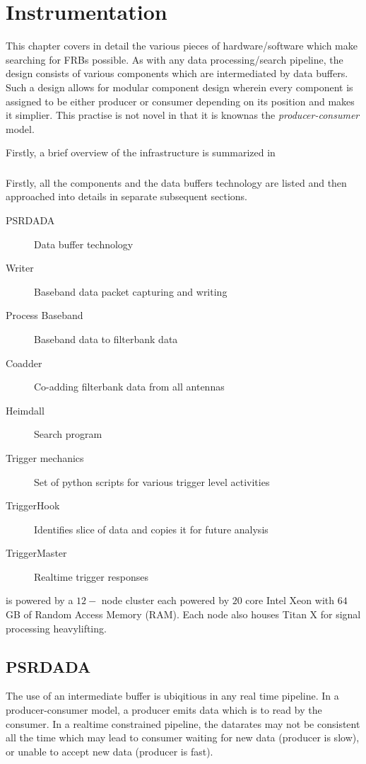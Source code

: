 \chapter{Instrumentation}
\label{ch:inst}

\par This chapter covers in detail the various pieces of hardware/software which make searching for FRBs possible. As with any data processing/search pipeline, the design consists of various components which are intermediated by data buffers. Such a design allows for modular component design wherein every component is assigned to be either producer or consumer depending on its position and makes it simplier. This practise is not novel in that it is knownas the \emph{producer-consumer} model.

\par Firstly, a brief overview of the infrastructure is summarized in 

\subsection {}

\par Firstly, all the components and the data buffers technology are listed and then approached into details in separate subsequent sections.
\begin{description}
\item[PSRDADA] Data buffer technology
\item[Writer]  Baseband data packet capturing and writing
\item[Process Baseband] Baseband data to filterbank data
\item[Coadder] Co-adding filterbank data from all antennas
\item[Heimdall] Search program 
\item[Trigger mechanics] Set of python scripts for various trigger level activities
\item[TriggerHook]   Identifies slice of data and copies it for future analysis
\item[TriggerMaster] Realtime trigger responses
\end{description}

\par \vf is powered by a $12-$ node cluster each powered by $20$ core Intel Xeon with $64$ GB of Random Access Memory (RAM). Each node also houses  Titan X for signal processing heavylifting.

\section {PSRDADA}
\par The use of an intermediate buffer is ubiqitious in any real time pipeline. In a producer-consumer model, a producer emits data which is to read by the consumer. In a realtime constrained pipeline, the datarates may not be consistent all the time which may lead to consumer waiting for new data (producer is slow), or unable to accept new data (producer is fast).

